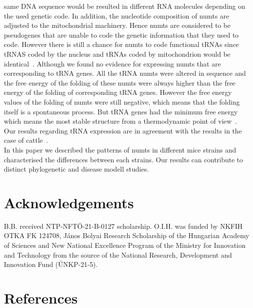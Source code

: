 \documentclass[a4paper,12pt]{article}
\numberwithin{equation}{section} %
\begin{document}
same DNA sequence would be resulted in different RNA molecules depending on the used genetic code. In addition, the nucleotide composition of numts are adjusted to the mitochondrial machinery. Hence numts are considered to be pseudogenes that are unable to code the genetic information that they used to code. However there is still a chance for numts to code functional tRNAs since tRNAS coded by the nucleus and tRNAs coded by mitochondrion would be identical~. Although we found no evidence for expressing numts that are corresponding to tRNA genes. All the tRNA numts were altered in sequence and the free energy of the folding of these numts were always higher than the free energy of the folding of corresponding tRNA genes. However the free energy values of the folding of numts were still negative, which means that the folding itself is a spontaneous process. But tRNA genes had the minimum free energy which means the most stable structure from a thermodynamic point of view~. Our results regarding tRNA expression are in agreement with the results in the case of cattle~.\\ \indent In this paper we described the patterns of numts in different mice strains and characterised the differences between each strains. Our results can contribute to distinct phylogenetic and disease modell studies.

\section{Acknowledgements}
\indent B.B. received NTP-NFTÖ-21-B-0127 scholarship. O.I.H. was funded by NKFIH OTKA FK 124708, János Bolyai Research Scholarship of the Hungarian Academy of Sciences and New National Excellence Program of the Ministry for Innovation and Technology from the source of the National Research, Development and Innovation Fund (ÚNKP-21-5).
\section{References}
\renewcommand{\refname}{}


\end{document}
